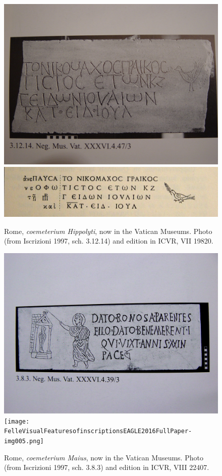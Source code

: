 \documentclass[amsthm,ebook]{saparticle}
\begin{document}
\begin{figure}[!bp]
\centering
 \includegraphics[width=\columnwidth]{FelleVisualFeaturesofinscriptionsEAGLE2016FullPaper-img002.jpg}
 \includegraphics[width=\columnwidth]{FelleVisualFeaturesofinscriptionsEAGLE2016FullPaper-img003.png}
\caption{Rome, \emph{coemeterium Hippolyti}, now in the Vatican Museums. Photo (from Iscrizioni 1997, sch. 3.12.14) and
edition in ICVR, VII 19820.}
\label{fig:3}
\end{figure}




\begin{figure}[!bp]
\centering
 \includegraphics[width=\columnwidth]{FelleVisualFeaturesofinscriptionsEAGLE2016FullPaper-img004.png}
  \texttt{[image: FelleVisualFeaturesofinscriptionsEAGLE2016FullPaper-img005.png]}

\caption{Rome, \emph{coemeterium Maius}, now in the Vatican Museums. Photo (from Iscrizioni 1997, sch. 3.8.3) and edition in
ICVR, VIII 22407.}
\label{fig:4}
\end{figure}
\end{document}
